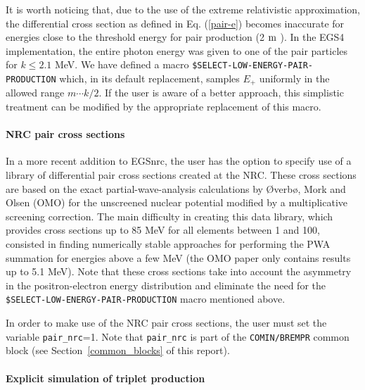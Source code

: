 It is worth noticing that, due to the use of the extreme 
relativistic approximation,  the differential cross 
section as defined in Eq. (\ref{pair-e}) becomes inaccurate 
for energies close to the threshold energy for pair production 
(2 $\rm m$ ).  
In the EGS4 implementation, the entire photon energy 
was given to one of the pair particles for $k \le 2.1$ MeV. 
We have defined a macro {\tt \$SELECT-LOW-ENERGY-PAIR-PRODUCTION} 
which, in its default replacement, samples $E_+$ uniformly 
in the allowed range $m \cdots k/2$. If the user is aware 
of a better approach, this simplistic treatment can be 
modified by the appropriate replacement of this macro.   

\paragraph{NRC pair cross sections}\hfill
{}

In a more recent addition to EGSnrc, the user has the option
to specify use of a library of differential pair cross sections created
at the NRC. These cross sections are based on the exact partial-wave-analysis 
calculations by {\O}verb{\o}, Mork and Olsen (OMO) \cite{Ov73} for the 
unscreened nuclear potential modified by a multiplicative screening correction. 
The main difficulty in creating this data library, which provides cross 
sections up to 85 MeV for all elements between 1 and 100, consisted in finding 
numerically stable approaches for performing the PWA summation for energies 
above a few MeV (the OMO paper \cite{Ov73} only contains results up to 5.1 MeV). 
Note that these cross sections take into account the asymmetry in the
positron-electron energy distribution and eliminate the need
for the {\tt \$SELECT-LOW-ENERGY-PAIR-PRODUCTION} macro mentioned
above.

In order to make use of the NRC pair cross sections, the user
must set the variable {\tt pair\_nrc}=1.  Note that
{\tt pair\_nrc} is part of the {\tt COMIN/BREMPR} common block
(see Section~\ref{common_blocks} of this report).

\paragraph{Explicit simulation of triplet production}\hfill
{}

